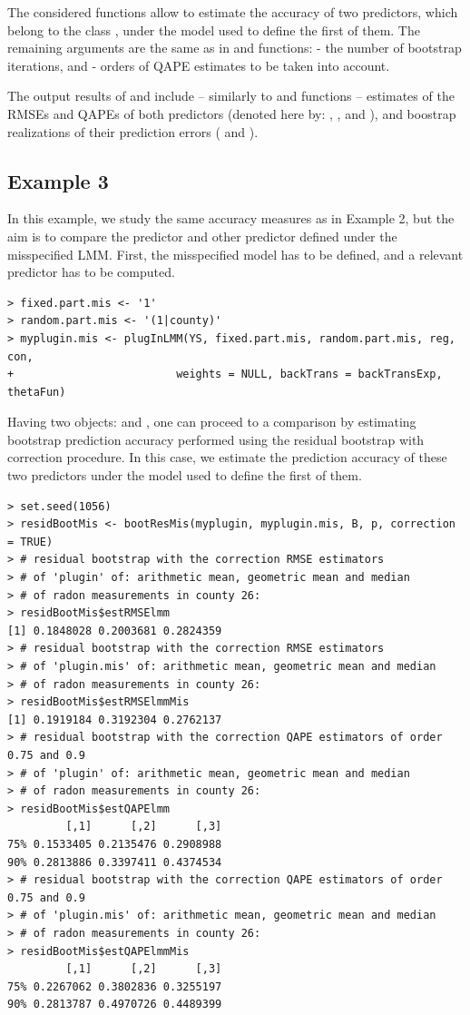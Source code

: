 The considered functions allow to estimate the accuracy of two predictors, which belong to the class , under the model used to define the first of them. The remaining arguments are the same as in  and  functions:  - the number of bootstrap iterations, and  - orders of QAPE estimates to be taken into account.

The output results of  and  include -- similarly to  and  functions -- estimates of the RMSEs and QAPEs of both predictors (denoted here by: , ,  and ), and boostrap realizations of their prediction errors ( and ).

\subsection{Example 3}

In this example, we study the same accuracy measures as in Example 2, but the aim is to compare the predictor  and other predictor defined under the misspecified LMM. First, the misspecified model has to be defined, and a relevant predictor has to be computed.
\begin{verbatim}
> fixed.part.mis <- '1'
> random.part.mis <- '(1|county)'
> myplugin.mis <- plugInLMM(YS, fixed.part.mis, random.part.mis, reg, con,
+                         weights = NULL, backTrans = backTransExp, thetaFun)
\end{verbatim}
Having two objects:  and , one can proceed to a comparison by estimating bootstrap prediction accuracy performed using the residual bootstrap with correction procedure. In this case, we estimate the prediction accuracy of these two predictors under the model used to define the first of them.
\begin{verbatim}
> set.seed(1056)
> residBootMis <- bootResMis(myplugin, myplugin.mis, B, p, correction = TRUE)
> # residual bootstrap with the correction RMSE estimators
> # of 'plugin' of: arithmetic mean, geometric mean and median
> # of radon measurements in county 26:
> residBootMis$estRMSElmm
[1] 0.1848028 0.2003681 0.2824359
> # residual bootstrap with the correction RMSE estimators
> # of 'plugin.mis' of: arithmetic mean, geometric mean and median
> # of radon measurements in county 26:
> residBootMis$estRMSElmmMis
[1] 0.1919184 0.3192304 0.2762137
> # residual bootstrap with the correction QAPE estimators of order 0.75 and 0.9
> # of 'plugin' of: arithmetic mean, geometric mean and median
> # of radon measurements in county 26:
> residBootMis$estQAPElmm
         [,1]      [,2]      [,3]
75% 0.1533405 0.2135476 0.2908988
90% 0.2813886 0.3397411 0.4374534
> # residual bootstrap with the correction QAPE estimators of order 0.75 and 0.9
> # of 'plugin.mis' of: arithmetic mean, geometric mean and median
> # of radon measurements in county 26:
> residBootMis$estQAPElmmMis
         [,1]      [,2]      [,3]
75% 0.2267062 0.3802836 0.3255197
90% 0.2813787 0.4970726 0.4489399
\end{verbatim}

